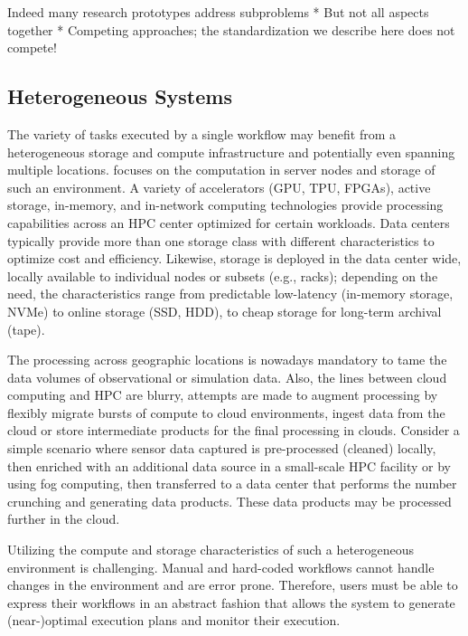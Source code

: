 \documentclass[a4paper, twocolumn]{article}
\begin{document}
Indeed many research prototypes address subproblems
* But not all aspects together
* Competing approaches; the standardization we describe here does not compete!

\subsection{Heterogeneous Systems}

The variety of tasks executed by a single workflow may benefit from a heterogeneous storage and compute infrastructure and potentially even spanning multiple locations.
 focuses on the computation in server nodes and storage of such an environment.
A variety of accelerators (GPU, TPU, FPGAs), active storage, in-memory, and in-network computing technologies provide processing capabilities across an HPC center optimized for certain workloads.
Data centers typically provide more than one storage class with different characteristics to optimize cost and efficiency.
Likewise, storage is deployed in the data center wide, locally available to individual nodes or subsets (e.g., racks); depending on the need, the characteristics range from predictable low-latency (in-memory storage, NVMe) to online storage (SSD, HDD), to cheap storage for long-term archival (tape).

The processing across geographic locations is nowadays mandatory to tame the data volumes of observational or simulation data.
Also, the lines between cloud computing and HPC are blurry, attempts are made to augment processing by flexibly migrate bursts of compute to cloud environments, ingest data from the cloud or store intermediate products for the final processing in clouds.
Consider a simple scenario where sensor data captured is pre-processed (cleaned) locally, then enriched with an additional data source in a small-scale HPC facility or by using fog computing, then transferred to a data center that performs the number crunching and generating data products.
These data products may be processed further in the cloud.

Utilizing the compute and storage characteristics of such a heterogeneous environment is challenging.
Manual and hard-coded workflows cannot handle changes in the environment and are error prone.
Therefore, users must be able to express their workflows in an abstract fashion that allows the system to generate (near-)optimal execution plans and monitor their execution.
\end{document}
